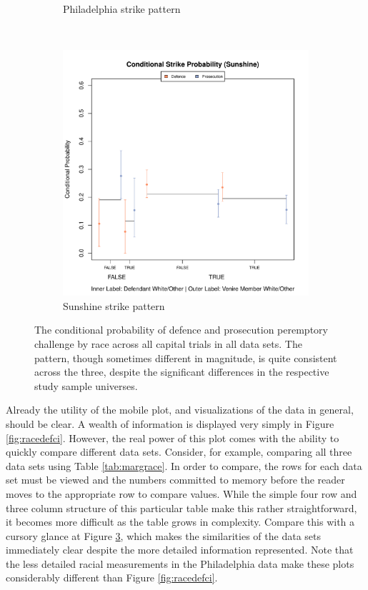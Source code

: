 \documentclass[12pt]{article}
\begin{document}
\begin{figure}[h!]
\begin{subfigure}{0.32\textwidth}
    \caption{\footnotesize Philadelphia strike pattern}
    \label{fig:philcomp}
  \end{subfigure}
  ~
  \begin{subfigure}{0.32\textwidth}
    \includegraphics[scale=0.32]{SunshineCompPlot}
    \caption{\footnotesize Sunshine strike pattern}
    \label{fig:suncomp}
  \end{subfigure}
  \caption[Strikes by Racial Combination (All Capital Trial Data)]
  {\footnotesize The conditional probability of defence and prosecution peremptory challenge by race across all
    capital trials in all data sets. The pattern, though sometimes different in magnitude, is quite consistent across the three,
    despite the significant differences in the respective study sample universes.}
  \label{fig:racedefalldata}
\end{figure}

Already the utility of the mobile plot, and visualizations of the data in general, should be clear. A wealth of information is displayed very simply in Figure \ref{fig:racedefci}. However, the real power of this plot comes with the ability to quickly compare different data sets. Consider, for example, comparing all three data sets using Table \ref{tab:margrace}. In order to compare, the rows for each data set must be viewed and the numbers committed to memory before the reader moves to the appropriate row to compare values. While the simple four row and three column structure of this particular table make this rather straightforward, it becomes more difficult as the table grows in complexity. Compare this with a cursory glance at Figure \ref{fig:racedefalldata}, which makes the similarities of the data sets immediately clear despite the more detailed information represented. Note that the less detailed racial measurements in the Philadelphia data make these plots considerably different than Figure \ref{fig:racedefci}.
\end{document}
